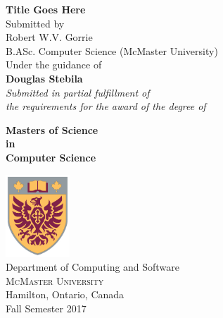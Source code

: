 \begin{titlepage}

\begin{center}
\Large \textbf {Title Goes Here}\\[1in]

\normalsize Submitted by \\[0.25in]

Robert W.V. Gorrie \\
B.ASc. Computer Science (McMaster University)\\

\vspace{.6in}
Under the guidance of\\
{\textbf{Douglas Stebila}}\\[0.6in]

\small \emph{Submitted in partial fulfillment of\\
        the requirements for the award of the degree of}
        \vspace{.2in}

       {\bf Masters of Science \\in\\ Computer Science}\\[0.5in]

\vfill

\includegraphics[width=0.18\textwidth]{cresticon}\\[0.1in]
\Large{Department of Computing and Software}\\
\normalsize
\textsc{McMaster University}\\
Hamilton, Ontario, Canada\\
\vspace{0.2cm}
Fall Semester 2017

\end{center}

\end{titlepage}
